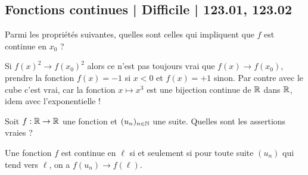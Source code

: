 \subsection{Fonctions continues | Difficile | 123.01, 123.02}


\begin{question}
Parmi les propriétés suivantes, quelles sont celles qui impliquent que $f$ est continue en $x_ 0$ ?
\begin{answers}



\end{answers}
\begin{explanations}
Si $f(x)^2 \to f(x_0)^2$  alors ce n'est pas toujours vrai que $f(x) \to f(x_0)$, prendre la fonction $f(x)=-1$ si $x<0$ et $f(x)=+1$ sinon. Par contre avec le cube c'est vrai, car la fonction $x \mapsto x^3$ est une bijection continue de $\mathbb{R}$ dans $\mathbb{R}$, idem avec l'exponentielle !
\end{explanations}
\end{question}


\begin{question}
Soit $f : \mathbb{R} \to \mathbb{R}$ une fonction et $(u_n)_{n\in\mathbb{N}}$ une suite. Quelles sont les assertions vraies ?
\begin{answers}



  
\end{answers}
\begin{explanations}
Une fonction $f$ est continue en $\ell$ si et seulement si 
pour toute suite $(u_n)$ qui tend vers $\ell$, on a $f(u_n) \to f(\ell)$.
\end{explanations}
\end{question}


